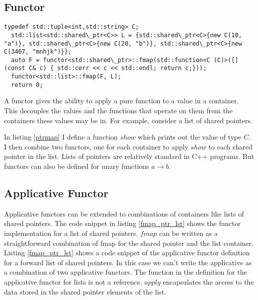 \documentclass[12pt,fleqn]{article}
\begin{document}
\subsection{Functor}
%
%


%
%
\begin{minipage}{\linewidth}
\begin{lstlisting}[caption=mapping over a list of shared pointers, label=ptrmap]
  typedef std::tuple<int,std::string> C;
  std::list<std::shared\_ptr<C>> L = {std::shared\_ptr<C>{new C(10, "a")}, std::shared\_ptr<C>{new C(20, "b")}, std::shared\_ptr<C>{new C(3467, "mnhjk")}};
  auto F = functor<std::shared\_ptr>::fmap(std::function<C (C)>([](const C& c) { std::cerr << c << std::endl; return c;}));
  functor<std::list>::fmap(F, L);
  return 0;
\end{lstlisting}
\end{minipage}
%
%
%

A functor gives the ability to apply a pure function to a value in a container.
This decouples the values and the functions that operate on them from the containers these values may be in.
For example, consider a list of shared pointers.

In listing \ref{ptrmap} I define a function $show$ which prints out the value of type $C$. I then combine two functors, one for each container to apply $show$ 
to each shared pointer in the list.
Lists of pointers are relatively standard in C++ programs. But functors can also be defined for unary functions $a \rightarrow b$.

%
%
%
\subsection{Applicative Functor}
%
%

Applicative functors can be extended to combinations of containers like lists of shared pointers.
The code snippet in listing \ref{fmap_ptr_lst} shows the functor implementation for a list of shared pointers.
$fmap$ can be written as a straightforward combination of fmap for the shared pointer and the list container.
Listing \ref{fmap_ptr_lst} shows a code snippet of the applicative functor definition for a forward list of shared pointers.
In this case we can't write the applicative as a combination of two applicative functors. 
The function in the definition for the applicative functor for lists is not a reference.
$apply$ encapsulates the access to the data stored in the shared pointer elements of the list.
\end{document}
